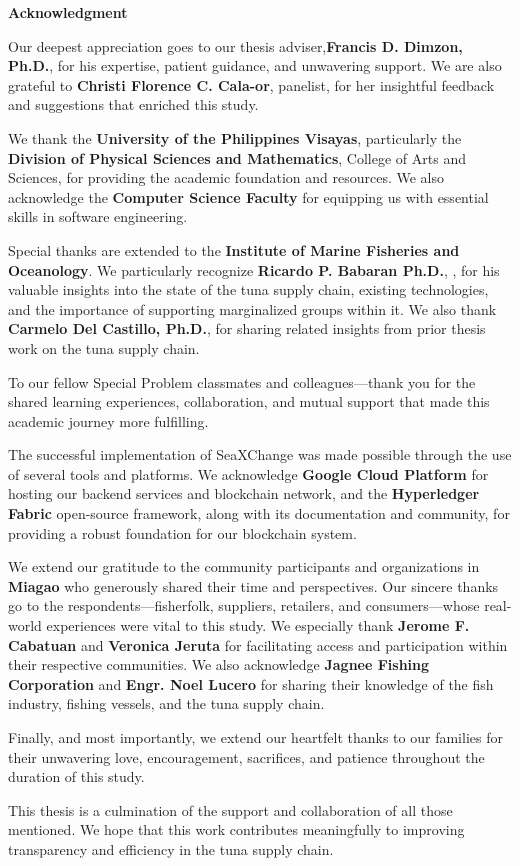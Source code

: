 \begin{center}
	\textbf{Acknowledgment}
\end{center}

Our deepest appreciation goes to our thesis adviser,\textbf{Francis D. Dimzon, Ph.D.}, for his expertise, patient guidance, and unwavering support. We are also grateful to \textbf{Christi Florence C. Cala-or}, panelist, for her insightful feedback and suggestions that enriched this study.

We thank the \textbf{University of the Philippines Visayas}, particularly the \textbf{Division of Physical Sciences and Mathematics}, College of Arts and Sciences, for providing the academic foundation and resources. We also acknowledge the \textbf{Computer Science Faculty} for equipping us with essential skills in software engineering.

Special thanks are extended to the \textbf{Institute of Marine Fisheries and Oceanology}. We particularly recognize \textbf{Ricardo P. Babaran Ph.D.}, , for his valuable insights into the state of the tuna supply chain, existing technologies, and the importance of supporting marginalized groups within it. We also thank \textbf{Carmelo Del Castillo, Ph.D.}, for sharing related insights from prior thesis work on the tuna supply chain. 

To our fellow Special Problem classmates and colleagues—thank you for the shared learning experiences, collaboration, and mutual support that made this academic journey more fulfilling.

The successful implementation of SeaXChange was made possible through the use of several tools and platforms. We acknowledge \textbf{Google Cloud Platform} for hosting our backend services and blockchain network, and the \textbf{Hyperledger Fabric} open-source framework, along with its documentation and community, for providing a robust foundation for our blockchain system.

We extend our gratitude to the community participants and organizations in \textbf{Miagao} who generously shared their time and perspectives. Our sincere thanks go to the respondents—fisherfolk, suppliers, retailers, and consumers—whose real-world experiences were vital to this study. We especially thank \textbf{Jerome F. Cabatuan} and \textbf{Veronica Jeruta} for facilitating access and participation within their respective communities. We also acknowledge \textbf{Jagnee Fishing Corporation} and \textbf{Engr. Noel Lucero} for sharing their knowledge of the fish industry, fishing vessels, and the tuna supply chain.

Finally, and most importantly, we extend our heartfelt thanks to our families for their unwavering love, encouragement, sacrifices, and patience throughout the duration of this study.

This thesis is a culmination of the support and collaboration of all those mentioned. We hope that this work contributes meaningfully to improving transparency and efficiency in the tuna supply chain.
